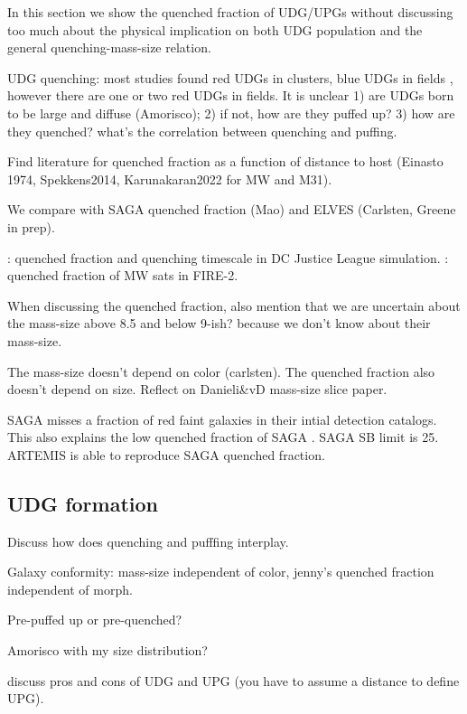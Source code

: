 \documentclass[twocolumn,astrosymb,twocolappendix]{aastex631}
\begin{document}
\begin{CJK*}{UTF8}{gbsn}
In this section we show the quenched fraction of UDG/UPGs without discussing too much about the physical implication on both UDG population and the general quenching-mass-size relation.

UDG quenching: most studies found red UDGs in clusters, blue UDGs in fields \citep{Prole2019,Leisman2017}, however there are one or two red UDGs in fields. It is unclear 1) are UDGs born to be large and diffuse (Amorisco); 2) if not, how are they puffed up? 3) how are they quenched? what's the correlation between quenching and puffing. 

Find literature for quenched fraction as a function of distance to host (Einasto 1974, Spekkens2014, Karunakaran2022 for MW and M31).

We compare with SAGA quenched fraction (Mao) and ELVES (Carlsten, Greene in prep).

\citep{Baxter2021}

\citep{Akins2021}: quenched fraction and quenching timescale in DC Justice League simulation.
\citep{Samuel2022}: quenched fraction of MW sats in FIRE-2.

When discussing the quenched fraction, also mention that we are uncertain about the mass-size above 8.5 and below 9-ish? because we don't know about their mass-size.

The mass-size doesn't depend on color (carlsten). The quenched fraction also doesn't depend on size. Reflect on Danieli\&vD mass-size slice paper. 

SAGA misses a fraction of red faint galaxies in their intial detection catalogs. This also explains the low quenched fraction of SAGA \citep{CarlstenELVES2022}.
SAGA SB limit is 25. ARTEMIS is able to reproduce SAGA quenched fraction. 







\subsection{UDG formation}
Discuss how does quenching and pufffing interplay.

Galaxy conformity: mass-size independent of color, jenny's quenched fraction independent of morph. 

Pre-puffed up or pre-quenched?

Amorisco with my size distribution?

discuss pros and cons of UDG and UPG (you have to assume a distance to define UPG).


\end{CJK*}
\end{document}
